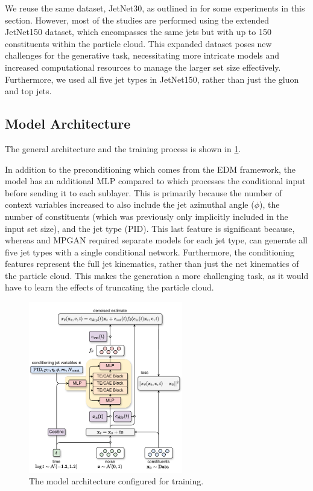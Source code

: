 We reuse the same dataset, JetNet30, as outlined in  for some experiments in this section.
However, most of the studies are performed using the extended JetNet150 dataset, which encompasses the same jets but with up to 150 constituents within the particle cloud.
This expanded dataset poses new challenges for the generative task, necessitating more intricate models and increased computational resources to manage the larger set size effectively.
Furthermore, we used all five jet types in JetNet150, rather than just the gluon and top jets.

\subsection{Model Architecture}

The general \pcdroid architecture and the training process is shown in \cref{fig:droid_arch_train}.

In addition to the preconditioning which comes from the EDM framework, the model has an additional MLP compared to \pcjedi which processes the conditional input before sending it to each sublayer.
This is primarily because the number of context variables increased to also include the jet azimuthal angle ($\phi$), the number of constituents (which was previously only implicitly included in the input set size), and the jet type (PID).
This last feature is significant because, whereas \pcjedi and MPGAN required separate models for each jet type, \pcdroid can generate all five jet types with a single conditional network.
Furthermore, the conditioning features represent the full jet kinematics, rather than just the net kinematics of the particle cloud.
This makes the generation a more challenging task, as it would have to learn the effects of truncating the particle cloud.

\begin{figure}[htpb]
    \centering
    \includegraphics[width=0.6\textwidth]{Figures/jet_generation/pcdroid.pdf}
    \caption{The \pcdroid model architecture configured for training.}
    \label{fig:droid_arch_train}
\end{figure}

